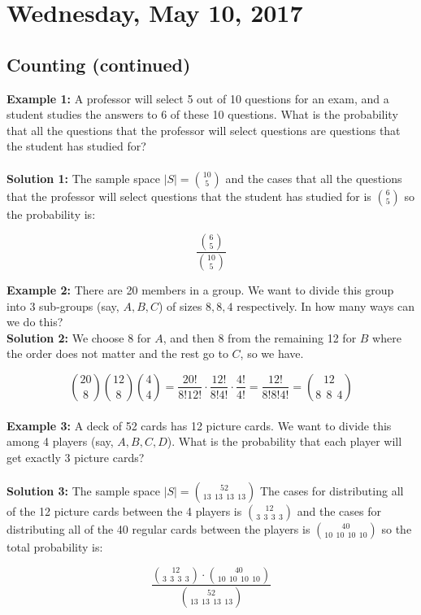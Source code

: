 \documentclass[12pt, twoside]{article}
\begin{document}
\pagebreak

\section{Wednesday, May 10, 2017}

\subsection{Counting (continued)}

\textbf{Example 1:} A professor will select 5 out of 10 questions for an exam, and a student studies the answers to 6 of these 10 questions. What is the probability that all the questions that the professor will select questions are questions that the student has studied for?\\
\\
\textbf{Solution 1:} The sample space $|S| = \binom{10}{5}$ and the cases that all the questions that the professor will select questions that the student has studied for is $\binom{6}{5}$ so the probability is:

$$\frac{\binom{6}{5}}{\binom{10}{5}}$$

\textbf{Example 2:} There are 20 members in a group. We want to divide this group into 3 sub-groups (say, $A, B, C$) of sizes $8,8,4$ respectively. In how many ways can we do this?\\

\textbf{Solution 2:} We choose 8 for $A$, and then 8 from the remaining 12 for $B$ where the order does not matter and the rest go to $C$, so we have.

$$\binom{20}{8} \binom{12}{8} \binom{4}{4} = \frac{20!}{8! 12!} \cdot \frac{12!}{8! 4!} \cdot \frac{4!}{4!} = \frac{12!}{8!8!4!} = \binom{12}{8\:\: 8\:\: 4}$$
\\
\textbf{Example 3:} A deck of 52 cards has 12 picture cards. We want to divide this among 4 players (say, $A, B, C, D$). What is the probability that each player will get exactly 3 picture cards?\\
\\
\textbf{Solution 3:} The sample space $|S| = \binom{52}{13\:\:13\:\:13\:\:13}$ The cases for distributing all of the 12 picture cards between the 4 players is $\binom{12}{3\:\:3\:\:3\:\:3}$ and the cases for distributing all of the 40 regular cards between the players is $\binom{40}{10\:\:10\:\:10\:\:10}$ so the total probability is:

$$\frac{\binom{12}{3\:\:3\:\:3\:\:3} \cdot \binom{40}{10\:\:10\:\:10\:\:10}}{\binom{52}{13\:\:13\:\:13\:\:13}}$$
\end{document}
